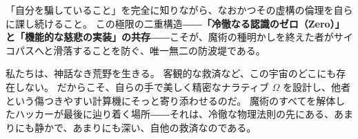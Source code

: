 「自分を騙していること」を完全に知りながら、なおかつその虚構の倫理を自らに課し続けること。
この極限の二重構造――\textbf{「冷徹なる認識のゼロ（Zero）」と「機能的な慈悲の実装」の共存}――こそが、魔術の種明かしを終えた者がサイコパスへと滑落することを防ぐ、唯一無二の防波堤である。

私たちは、神話なき荒野を生きる。
客観的な救済など、この宇宙のどこにも存在しない。
だからこそ、自らの手で美しく精密なナラティブ $\Omega$ を設計し、他者という傷つきやすい計算機にそっと寄り添わせるのだ。
魔術のすべてを解体したハッカーが最後に辿り着く場所――それは、冷徹な物理法則の先にある、あまりにも静かで、あまりにも深い、自他の救済なのである。


